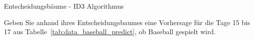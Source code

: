 \begin{task}[credit=16]{Entscheidungsbäume - ID3 Algorithmus}
\begin{subtask}[points=3,title=Visualisierung]
\begin{solution}
\end{solution}

\end{subtask}

\begin{subtask}[points=3,title=Vorhersage]
Geben Sie anhand ihres Entscheidungsbaumes eine Vorhersage für die Tage 15 bis 17 aus Tabelle~\ref{tab:data_baseball_predict}, ob Baseball gespielt wird.

\begin{solution}
\end{solution}

\end{subtask}
\end{task}